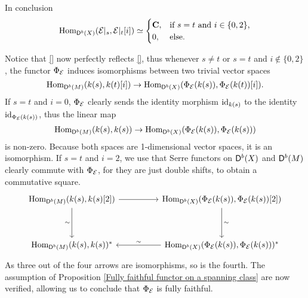     In conclusion
    \begin{equation}
            \operatorname{Hom}_{\mathsf{D}^b(X)}(\mathcal E|_s, \mathcal E|_t[i]) \simeq \begin{cases}
                \mathbf C, &\text{if $s = t$ and $i \in \{0, 2\}$,} \\
                0, &\text{else.}
            \end{cases}
    \end{equation}

    Notice that \eqref{} now perfectly reflects \eqref{}, thus whenever $s \neq t$ or $s = t$ and $i \notin \{0,2\}$, the functor $\Phi_{\mathcal E}$ induces isomorphisms between two trivial vector spaces
    \[
        \operatorname{Hom}_{\mathsf{D}^b(M)}(k(s), k(t)[i]) \to \operatorname{Hom}_{\mathsf{D}^b(X)}(\Phi_{\mathcal E}(k(s)), \Phi_{\mathcal E}(k(t))[i]).
    \]
    If $s = t$ and $i = 0$, $\Phi_{\mathcal E}$ clearly sends the identity morphism $\operatorname{id}_{k(s)}$ to the identity $\operatorname{id}_{\Phi_{\mathcal E}(k(s))}$, thus the linear map
    \[
        \operatorname{Hom}_{\mathsf{D}^b(M)}(k(s), k(s)) \to \operatorname{Hom}_{\mathsf{D}^b(X)}(\Phi_{\mathcal E}(k(s)), \Phi_{\mathcal E}(k(s)))
    \] 
    is non-zero. Because both spaces are 1-dimensional vector spaces, it is an isomorphism.
    If $s = t$ and $i = 2$, we use that Serre functors on $\mathsf{D}^b(X)$ and $\mathsf{D}^b(M)$ clearly commute with $\Phi_{\mathcal E}$, for they are just double shifts, to obtain a commutative square.
    \[\begin{tikzcd}[column sep = normal, row sep = 1.8em]
        \Hom_{\derb{M}}(k(s), k(s)[2]) && \Hom_{\derb{X}}(\fm{\E}(k(s)), \fm{\E}(k(s))[2]) \\
        \\
        \Hom_{\derb{M}}(k(s), k(s))^* && \Hom_{\derb{X}}(\fm{\E}(k(s)), \fm{\E}(k(s)))^*
        \arrow["{}", from=1-1, to=1-3]
        \arrow["{\sim}"', from=1-1, to=3-1]
        \arrow["{\sim}", from=1-3, to=3-3]
        \arrow["\sim"', from=3-3, to=3-1]
    \end{tikzcd}\]
    As three out of the four arrows are isomorphisms, so is the fourth. The assumption of Proposition \ref{Fully faithful functor on a spanning class} are now verified, allowing us to conclude that $\Phi_{\mathcal E}$ is fully faithful.